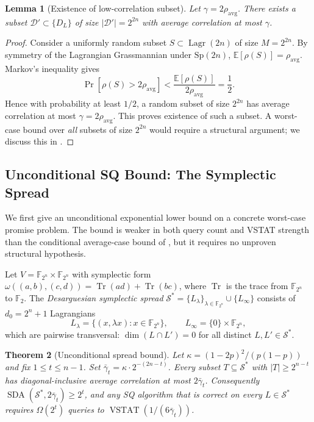 \documentclass[11pt,a4paper]{article}
\theoremstyle{plain}
\newtheorem{theorem}{Theorem}[section]
\newtheorem{lemma}[theorem]{Lemma}
\theoremstyle{definition}
\newcommand{\F}{\mathbb{F}}
\newcommand{\E}{\mathbb{E}}
\DeclareMathOperator{\Lagr}{Lagr}
\DeclareMathOperator{\SDA}{SDA}
\DeclareMathOperator{\VSTAT}{VSTAT}
\begin{document}
\begin{lemma}[Existence of low-correlation subset]
\label{lem:sda}
Let $\gamma = 2\rho_{\mathrm{avg}}$. There exists a subset $\mathcal{D}' \subset \{D_L\}$ of size $|\mathcal{D}'| = 2^{2n}$ with average correlation at most $\gamma$.
\end{lemma}

\begin{proof}
Consider a uniformly random subset $S \subset \Lagr(2n)$ of size $M = 2^{2n}$. By symmetry of the Lagrangian Grassmannian under $\mathrm{Sp}(2n)$, $\E[\rho(S)] = \rho_{\mathrm{avg}}$. Markov's inequality gives
\[
\Pr[\rho(S) > 2\rho_{\mathrm{avg}}] < \frac{\E[\rho(S)]}{2\rho_{\mathrm{avg}}} = \frac{1}{2}.
\]
Hence with probability at least $1/2$, a random subset of size $2^{2n}$ has average correlation at most $\gamma = 2\rho_{\mathrm{avg}}$. This proves existence of such a subset. A worst-case bound over \emph{all} subsets of size $2^{2n}$ would require a structural argument; we discuss this in .
\end{proof}

\subsection{Unconditional SQ Bound: The Symplectic Spread}
\label{subsec:spread-bound}

We first give an unconditional exponential lower bound on a concrete worst-case promise problem. The bound is weaker in both query count and VSTAT strength than the conditional average-case bound of , but it requires no unproven structural hypothesis.

Let $V = \F_{2^n} \times \F_{2^n}$ with symplectic form $\omega((a,b),(c,d)) = \operatorname{Tr}(ad) + \operatorname{Tr}(bc)$, where $\operatorname{Tr}$ is the trace from $\F_{2^n}$ to $\F_2$. The \emph{Desarguesian symplectic spread} $\mathcal{S}^* = \{L_\lambda\}_{\lambda \in \F_{2^n}} \cup \{L_\infty\}$ consists of $d_0 = 2^n+1$ Lagrangians
\[
L_\lambda = \{(x, \lambda x) : x \in \F_{2^n}\}, \qquad L_\infty = \{0\} \times \F_{2^n},
\]
which are pairwise transversal: $\dim(L \cap L') = 0$ for all distinct $L, L' \in \mathcal{S}^*$.

\begin{theorem}[Unconditional spread bound]
\label{thm:main-sq-uncond}
Let $\kappa = (1-2p)^2/(p(1-p))$ and fix $1 \leq t \leq n-1$. Set $\bar\gamma_t = \kappa \cdot 2^{-(2n-t)}$. Every subset $T \subseteq \mathcal{S}^*$ with $|T| \geq 2^{n-t}$ has diagonal-inclusive average correlation at most $2\bar\gamma_t$. Consequently $\SDA(\mathcal{S}^*, 2\bar\gamma_t) \geq 2^t$, and any SQ algorithm that is correct on every $L \in \mathcal{S}^*$ requires $\Omega(2^t)$ queries to $\VSTAT(1/(6\bar\gamma_t))$.
\end{theorem}
\end{document}
